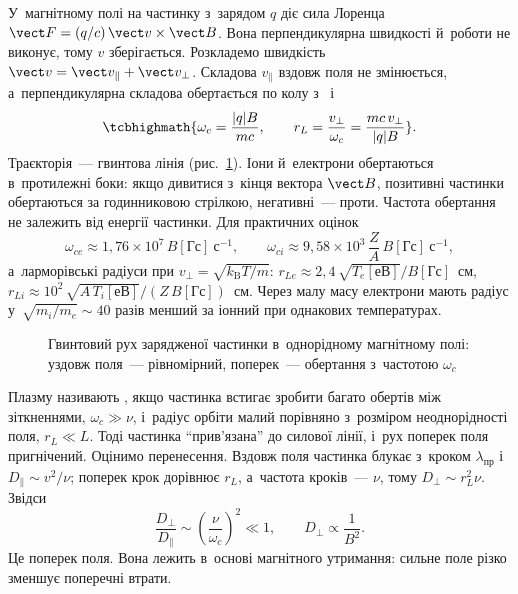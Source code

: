 У~магнітному полі на частинку з~зарядом $q$ діє сила Лоренца $\vect F=(q/c)\,\vect
v\times\vect B$. Вона перпендикулярна швидкості й~роботи не виконує, тому $v$
зберігається. Розкладемо швидкість $\vect v=\vect v_\parallel+\vect v_\perp$. Складова
$v_\parallel$ вздовж поля не змінюється, а~перпендикулярна складова обертається по колу
з~ і~
\begin{equation}\label{eq:larmor}
	\tcbhighmath{\omega_c=\frac{|q|B}{mc},\qquad r_L=\frac{v_\perp}{\omega_c}=\frac{mc\,v_\perp}{|q|B}}.
\end{equation}
Траєкторія~--- гвинтова лінія (рис.~\ref{pic:larmor-motion}). Іони й~електрони обертаються
в~протилежні боки: якщо дивитися з~кінця вектора $\vect B$, позитивні частинки обертаються
за годинниковою стрілкою, негативні~--- проти. Частота обертання не залежить від енергії
частинки. Для практичних оцінок
\begin{equation*}
	\omega_{ce}\approx1{,}76\times10^{7}\,B[\text{Гс}]~\mathrm{с}^{-1},\qquad
	\omega_{ci}\approx9{,}58\times10^{3}\,\frac ZA\,B[\text{Гс}]~\mathrm{с}^{-1},
\end{equation*}
а~ларморівські радіуси при $v_\perp=\sqrt{k_{\mathrm B}T/m}$:
$r_{Le}\approx2{,}4\,\sqrt{T_e[\text{еВ}]}/B[\text{Гс}]$~см,
$r_{Li}\approx10^2\,\sqrt{A\,T_i[\text{еВ}]}/(Z\,B[\text{Гс}])$~см. Через малу масу
електрони мають радіус у~$\sqrt{m_i/m_e}\sim40$ разів менший за іонний при однакових
температурах.

\begin{figure}[h!]\centering
	\caption{Гвинтовий рух зарядженої частинки в~однорідному магнітному полі: уздовж
	поля~--- рівномірний, поперек~--- обертання з~частотою $\omega_c$}
	\label{pic:larmor-motion}
\end{figure}

Плазму називають , якщо частинка встигає зробити багато обертів між
зіткненнями, $\omega_c\gg\nu$, і~радіус орбіти малий порівняно з~розміром неоднорідності
поля, $r_L\ll L$. Тоді частинка \enquote{прив'язана} до силової лінії, і~рух поперек поля
пригнічений. Оцінимо перенесення. Вздовж поля частинка блукає з~кроком
$\lambda_{\mathrm{пр}}$ і~$D_\parallel\sim v^2/\nu$; поперек крок дорівнює $r_L$,
а~частота кроків~--- $\nu$, тому $D_\perp\sim r_L^2\nu$. Звідси
\begin{equation*}
	\frac{D_\perp}{D_\parallel}\sim\left(\frac\nu{\omega_c}\right)^2\ll1,\qquad D_\perp\propto\frac1{B^2}.
\end{equation*}
Це  поперек поля. Вона лежить в~основі магнітного утримання:
сильне поле різко зменшує поперечні втрати.



